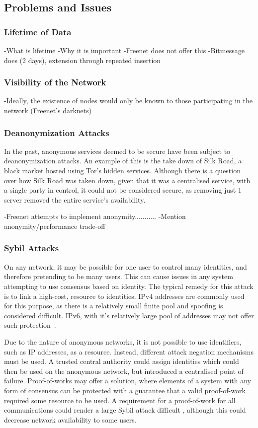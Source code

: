 	\subsection{Problems and Issues}
		\subsubsection*{Lifetime of Data}
			-What is lifetime
			-Why it is important
			-Freenet does not offer this
			-Bitmessage does (2 days), extension through repeated insertion
		\subsubsection*{Visibility of the Network}
			-Ideally, the existence of nodes would only be known to those participating in the network (Freenet's darknets)
		\subsubsection*{Deanonymization Attacks}
			In the past, anonymous services deemed to be secure have been subject to deanonymization attacks. An example of this is the take down of Silk Road, a black market hosted using Tor's hidden services. Although there is a question over how Silk Road was taken down, given that it was a centralised service, with a single party in control, it could not be considered secure, as removing just 1 server removed the entire service's availability.
			
			-Freenet attempts to implement anonymity...........
			-Mention anonymity/performance trade-off
		\subsubsection*{Sybil Attacks} \label{sybil_problems}
			On any network, it may be possible for one user to control many identities, and therefore pretending to be many users. This can cause issues in any system attempting to use consensus based on identity. The typical remedy for this attack is to link a high-cost, resource to identities. IPv4 addresses are commonly used for this purpose, as there is a relatively small finite pool and spoofing is considered difficult. IPv6, with it's relatively large pool of addresses may not offer such protection~\cite{cholez2009evaluation}.
		
			Due to the nature of anonymous networks, it is not possible to use identifiers, such as IP addresses, as a resource. Instead, different attack negation mechanisms must be used. A trusted central authority could assign identities which could then be used on the anonymous network, but introduced a centralised point of failure. Proof-of-works may offer a solution, where elements of a system with any form of consensus can be protected with a guarantee that a valid proof-of-work required some resource to be used. A requirement for a proof-of-work for all communications could render a large Sybil attack difficult \cite{borisov2006computational}, although this could decrease network availability to some users.
		
